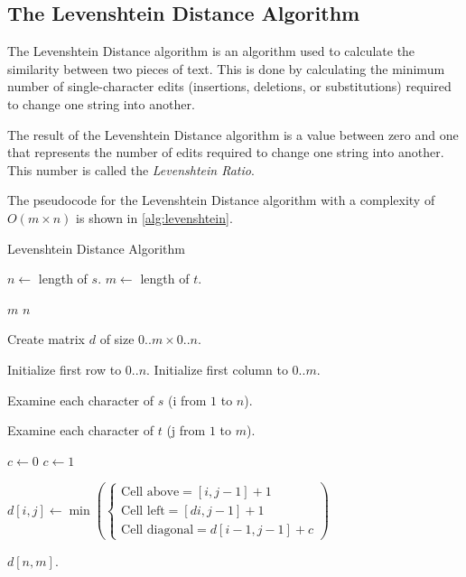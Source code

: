 \subsection{The Levenshtein Distance Algorithm}
\label{ssec:t-levenshtein}

The Levenshtein Distance algorithm is an algorithm used to calculate the similarity between two
pieces of text. This is done by calculating the minimum number of single-character edits
(insertions, deletions, or substitutions) required to change one string into another.\cite{po2020similarity}

The result of the Levenshtein Distance algorithm is a value between zero and one
that represents the number of edits required to change one string into another.
This number is called the \textit{Levenshtein Ratio}.

The pseudocode for the Levenshtein Distance algorithm with a complexity of $O(m \times n)$
is shown in \autoref{alg:levenshtein}.

\begin{algorithm}
  \small
  \caption{Levenshtein Distance Algorithm\cite{po2020similarity}}
  \label{alg:levenshtein}
  \begin{algorithmic}[1]
      \State $n \gets$ length of $s$.
      \State $m \gets$ length of $t$.

        \State \Return $m$
      \EndIf
        \State \Return $n$
      \EndIf

      \State Create matrix $d$ of size $0..m \times 0..n$.

      \State Initialize first row to $0..n$.
      \State Initialize first column to $0..m$.

      \State Examine each character of $s$ (i from $1$ to $n$).

      \State Examine each character of $t$ (j from $1$ to $m$).

        \State $c \gets 0$
      \Else
        \State $c \gets 1$
      \EndIf

      \State $d[i,j] \gets \min(
        \begin{cases}
          \text{Cell above} = [i,j-1] + 1 \\
          \text{Cell left} = [di,j-1] + 1 \\
          \text{Cell diagonal} = d[i-1,j-1] + c
        \end{cases}
      )$

      \State \Return $d[n,m]$.

    \EndFunction
  \end{algorithmic}
\end{algorithm}

